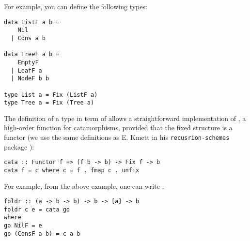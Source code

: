 For example, you can define the following types:
\begin{verbatim}
data ListF a b =
    Nil
  | Cons a b

data TreeF a b =
    EmptyF
  | LeafF a
  | NodeF b b

type List a = Fix (ListF a)
type Tree a = Fix (Tree a)
\end{verbatim}

The definition of a type in term of  allows a straightforward implementation of , a high-order function for catamorphisms, provided that the fixed structure is a functor (we use the same definitions as E. Kmett in his \verb|recusrion-schemes| package \cite{ekmett:eschems}):
\begin{verbatim}
cata :: Functor f => (f b -> b) -> Fix f -> b
cata f = c where c = f . fmap c . unfix
\end{verbatim}

For example,  from the above example, one can write :
\begin{verbatim}
foldr :: (a -> b -> b) -> b -> [a] -> b
foldr c e = cata go
where
go NilF = e
go (ConsF a b) = c a b
\end{verbatim}
